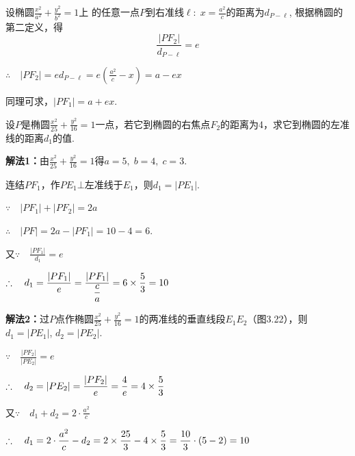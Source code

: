 设椭圆$\frac{x^2}{a^2}+\frac{y^2}{b^2}=1$上
的任意一点$P$到右准线$\ell:\; x=\frac{a^2}{c}$的距离为$d_{P-\ell}$, 
根据椭圆的第二定义，得
\[\frac{|PF_2|}{d_{P-\ell}}=e\]

$\therefore\quad |PF_2|=ed_{P-\ell}=e\left(\frac{a^2}{c}-x\right)=a-ex$

同理可求，$|PF_1|=a+ex$.





\begin{example}
    设$P$是椭圆$\frac{x^2}{25}+\frac{y^2}{16}=1$一点，若它到椭圆的右焦点$F_2$的距离为4，求它到椭圆的左准线的距离$d_1$的值.
\end{example}

\begin{solution}
\textbf{解法1：}由$\frac{x^2}{25}+\frac{y^2}{16}=1$得$a=5,\; b=4,\; c=3$.

\noindent
\begin{minipage}{.53\textwidth}\CTEXindent
连结$PF_1$，作$PE_1\bot $左准线于$E_1$，则$d_1=|PE_1|$.

$\because\quad |PF_1|+|PF_2|=2a $

$\therefore\quad |PF|=2a-|PF_1|=10-4=6$.

又$\because\quad \frac{|PF_1|}{d_1}=e$
\end{minipage}
\hfill
\begin{minipage}{.45\textwidth}
\centering
{}
\end{minipage}

$\therefore\quad d_1=\dfrac{|PF_1|}{e}=\dfrac{|PF_1|}{\dfrac{c}{a}}=6\times \dfrac{5}{3}=10$


\textbf{解法2：}过$P$点作椭圆$\frac{x^2}{25}+\frac{y^2}{16}=1$的两准线的垂直线段$E_1E_2$（图3.22），则$d_1=|PE_1|$, $d_2=|PE_2|$.

$\because\quad \frac{|PF_2|}{|PE_2|}=e$

$\therefore\quad d_2=|PE_2|=\dfrac{|PF_2|}{e}=\dfrac{4}{e}=4\times \dfrac{5}{3}$

又$\because\quad d_1+d_2=2\cdot  \frac{a^2}{c}$

$\therefore\quad d_1=2\cdot \dfrac{a^2}{c}-d_2=2\times \dfrac{25}{3}-4\times\dfrac{5}{3}=\dfrac{10}{3}\cdot (5-2)=10$
\end{solution}

